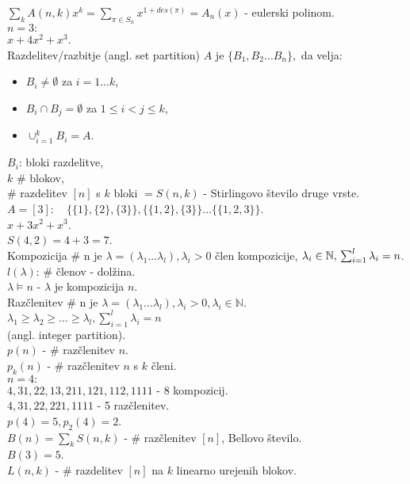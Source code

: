 \documentclass[a4paper, 12pt]{book}
\theoremstyle{definition}
\theoremstyle{remark}
\newcommand{\N}{\mathbb{N}}
\begin{document}
$\sum_k A(n,k) x^k = \sum_{\pi \in S_n} x^{1+des(\pi)} = A_n(x)$ - eulerski polinom. \\
$n=3:$ \\
$x + 4x^2 + x^3$. \\
Razdelitev/razbitje (angl. set partition) $A$ je $\{B_1, B_2 \dots B_n\},$ da velja:
\begin{itemize}[label={--}]
  \item $B_i \neq \emptyset$ za $i = 1 \dots k$,
  \item $B_i \cap B_j = \emptyset$ za $1 \leq i < j \leq k$,
  \item $\cup_{i=1}^k B_i = A$.
\end{itemize}
$B_i$: bloki razdelitve, \\
$k$ \# blokov, \\
\# razdelitev $[n]$ s $k$ bloki $= S(n,k)$ - Stirlingovo število druge vrste. \\
$A = [3]: \quad \{\{1\}, \{2\}, \{3\}\}, \{\{1,2\}, \{3\}\} \dots \{\{1,2,3\}\}$. \\
$x + 3 x^2 + x^3$. \\
$S(4,2) = 4 + 3 = 7$. \\
Kompozicija \# n je $\lambda = (\lambda_1 \dots \lambda_l), \lambda_i > 0$ člen kompozicije,
$\lambda_i \in \N, \\
\sum_{i=1}^{l} \lambda_i = n$. \\
$l(\lambda)$: \# členov - dolžina. \\
$\lambda \models n$ - $\lambda$ je kompozicija $n$. \\
Razčlenitev \# n je $\lambda = (\lambda_1 \dots \lambda_l), \lambda_i > 0, \lambda_i \in \N$. \\
$\lambda_1 \geq \lambda_2 \geq \dots \geq \lambda_l, \sum_{i=1}^{l} \lambda_i = n$ \\
(angl. integer partition). \\
$p(n)$ - \# razčlenitev $n$. \\
$p_k(n)$ - \# razčlenitev $n$ s $k$ členi. \\
$n=4:$ \\
$4, 31, 22, 13, 211, 121, 112, 1111$ - 8 kompozicij. \\
$4, 31, 22, 221, 1111$ - 5 razčlenitev. \\
$p(4) = 5, p_2(4) = 2$. \\
$B(n) = \sum_k S(n,k)$ - \# razčlenitev $[n]$, Bellovo število. \\
$B(3) = 5$. \\
$L(n,k)$ - \# razdelitev $[n]$ na $k$ linearno urejenih blokov. \\
\end{document}
